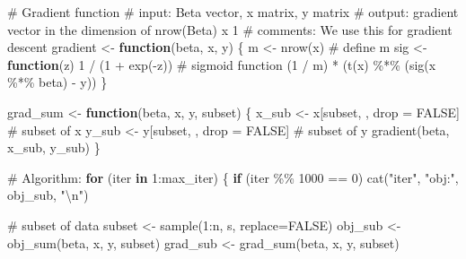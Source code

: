 \documentclass[
  letterpaper,
  DIV=11,
  numbers=noendperiod]{scrartcl}
\newenvironment{Shaded}{\begin{snugshade}}{\end{snugshade}}
\newcommand{\AttributeTok}[1]{\textcolor[rgb]{0.40,0.45,0.13}{#1}}
\newcommand{\CommentTok}[1]{\textcolor[rgb]{0.37,0.37,0.37}{#1}}
\newcommand{\ConstantTok}[1]{\textcolor[rgb]{0.56,0.35,0.01}{#1}}
\newcommand{\ControlFlowTok}[1]{\textcolor[rgb]{0.00,0.23,0.31}{\textbf{#1}}}
\newcommand{\DecValTok}[1]{\textcolor[rgb]{0.68,0.00,0.00}{#1}}
\newcommand{\FunctionTok}[1]{\textcolor[rgb]{0.28,0.35,0.67}{#1}}
\newcommand{\NormalTok}[1]{\textcolor[rgb]{0.00,0.23,0.31}{#1}}
\newcommand{\OtherTok}[1]{\textcolor[rgb]{0.00,0.23,0.31}{#1}}
\newcommand{\SpecialCharTok}[1]{\textcolor[rgb]{0.37,0.37,0.37}{#1}}
\newcommand{\StringTok}[1]{\textcolor[rgb]{0.13,0.47,0.30}{#1}}
\begin{document}
\begin{Shaded}
\begin{Highlighting}[]
  \CommentTok{\# Gradient function}
  \CommentTok{\# input: Beta vector, x matrix, y matrix}
  \CommentTok{\# output: gradient vector in the dimension of nrow(Beta) x 1}
  \CommentTok{\# comments: We use this for gradient descent}
\NormalTok{  gradient }\OtherTok{\textless{}{-}} \ControlFlowTok{function}\NormalTok{(beta, x, y) \{}
\NormalTok{    m }\OtherTok{\textless{}{-}} \FunctionTok{nrow}\NormalTok{(x)                       }\CommentTok{\# define m}
\NormalTok{    sig }\OtherTok{\textless{}{-}} \ControlFlowTok{function}\NormalTok{(z) }\DecValTok{1} \SpecialCharTok{/}\NormalTok{ (}\DecValTok{1} \SpecialCharTok{+} \FunctionTok{exp}\NormalTok{(}\SpecialCharTok{{-}}\NormalTok{z))  }\CommentTok{\# sigmoid function}
\NormalTok{    (}\DecValTok{1} \SpecialCharTok{/}\NormalTok{ m) }\SpecialCharTok{*}\NormalTok{ (}\FunctionTok{t}\NormalTok{(x) }\SpecialCharTok{\%*\%}\NormalTok{ (}\FunctionTok{sig}\NormalTok{(x }\SpecialCharTok{\%*\%}\NormalTok{ beta) }\SpecialCharTok{{-}}\NormalTok{ y))}
\NormalTok{  \}}
  
\NormalTok{  grad\_sum }\OtherTok{\textless{}{-}} \ControlFlowTok{function}\NormalTok{(beta, x, y, subset) \{}
\NormalTok{    x\_sub }\OtherTok{\textless{}{-}}\NormalTok{ x[subset, , drop }\OtherTok{=} \ConstantTok{FALSE}\NormalTok{]   }\CommentTok{\# subset of x}
\NormalTok{    y\_sub }\OtherTok{\textless{}{-}}\NormalTok{ y[subset, , drop }\OtherTok{=} \ConstantTok{FALSE}\NormalTok{]   }\CommentTok{\# subset of y}
    \FunctionTok{gradient}\NormalTok{(beta, x\_sub, y\_sub)}
\NormalTok{  \}}

  \CommentTok{\# Algorithm:}
  \ControlFlowTok{for}\NormalTok{ (iter }\ControlFlowTok{in} \DecValTok{1}\SpecialCharTok{:}\NormalTok{max\_iter) \{}
    \ControlFlowTok{if}\NormalTok{ (iter }\SpecialCharTok{\%\%} \DecValTok{1000} \SpecialCharTok{==} \DecValTok{0}\NormalTok{) }\FunctionTok{cat}\NormalTok{(}\StringTok{"iter"}\NormalTok{, }\StringTok{"obj:"}\NormalTok{, obj\_sub, }\StringTok{"}\SpecialCharTok{\textbackslash{}n}\StringTok{"}\NormalTok{)}
    
    \CommentTok{\# subset of data}
\NormalTok{    subset }\OtherTok{\textless{}{-}} \FunctionTok{sample}\NormalTok{(}\DecValTok{1}\SpecialCharTok{:}\NormalTok{n, s, }\AttributeTok{replace=}\ConstantTok{FALSE}\NormalTok{)}
\NormalTok{    obj\_sub }\OtherTok{\textless{}{-}} \FunctionTok{obj\_sum}\NormalTok{(beta, x, y, subset)}
\NormalTok{    grad\_sub }\OtherTok{\textless{}{-}} \FunctionTok{grad\_sum}\NormalTok{(beta, x, y, subset)}
    

\end{Highlighting}
\end{Shaded}
\end{document}
